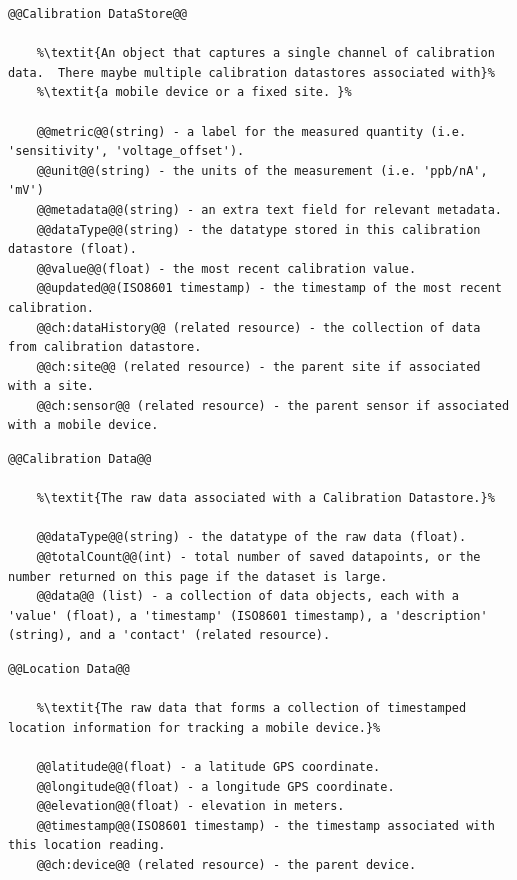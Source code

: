 \begin{lstlisting}[style=codedef]
@@Calibration DataStore@@
	
	%\textit{An object that captures a single channel of calibration data.  There maybe multiple calibration datastores associated with}%
	%\textit{a mobile device or a fixed site. }%	

	@@metric@@(string) - a label for the measured quantity (i.e. 'sensitivity', 'voltage_offset').
	@@unit@@(string) - the units of the measurement (i.e. 'ppb/nA', 'mV')
	@@metadata@@(string) - an extra text field for relevant metadata.
	@@dataType@@(string) - the datatype stored in this calibration datastore (float).
	@@value@@(float) - the most recent calibration value.	
	@@updated@@(ISO8601 timestamp) - the timestamp of the most recent calibration.
	@@ch:dataHistory@@ (related resource) - the collection of data from calibration datastore.
	@@ch:site@@ (related resource) - the parent site if associated with a site.
	@@ch:sensor@@ (related resource) - the parent sensor if associated with a mobile device.

\end{lstlisting}

\begin{lstlisting}[style=codedef]
@@Calibration Data@@
	
	%\textit{The raw data associated with a Calibration Datastore.}%

	@@dataType@@(string) - the datatype of the raw data (float).
	@@totalCount@@(int) - total number of saved datapoints, or the number returned on this page if the dataset is large.
	@@data@@ (list) - a collection of data objects, each with a 'value' (float), a 'timestamp' (ISO8601 timestamp), a 'description' (string), and a 'contact' (related resource).

\end{lstlisting}

\begin{lstlisting}[style=codedef]
@@Location Data@@
	
	%\textit{The raw data that forms a collection of timestamped location information for tracking a mobile device.}%

	@@latitude@@(float) - a latitude GPS coordinate.
	@@longitude@@(float) - a longitude GPS coordinate.
	@@elevation@@(float) - elevation in meters.
	@@timestamp@@(ISO8601 timestamp) - the timestamp associated with this location reading.
	@@ch:device@@ (related resource) - the parent device.

\end{lstlisting}

